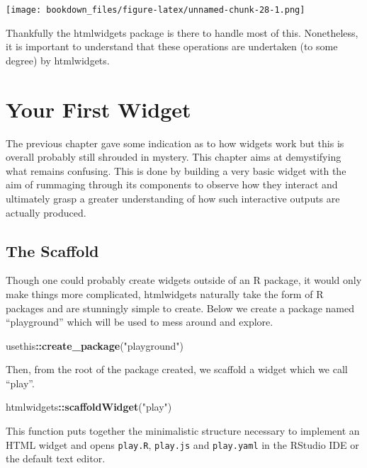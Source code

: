\documentclass[
]{krantz}
\makeatletter
\newenvironment{Shaded}{\begin{snugshade}}{\end{snugshade}}
\newcommand{\KeywordTok}[1]{\textcolor[rgb]{0.27,0.27,0.27}{\textbf{#1}}}
\newcommand{\NormalTok}[1]{#1}
\newcommand{\OperatorTok}[1]{\textcolor[rgb]{0.43,0.43,0.43}{\textbf{#1}}}
\newcommand{\StringTok}[1]{\textcolor[rgb]{0.5,0.5,0.5}{#1}}
\newenvironment{kframe}{%
\medskip{}
\setlength{\fboxsep}{.8em}
 \def\at@end@of@kframe{}%
 \ifinner\ifhmode%
  \def\at@end@of@kframe{\end{minipage}}%
  \begin{minipage}{\columnwidth}%
 \fi\fi%
 \def\FrameCommand##1{\hskip\@totalleftmargin \hskip-\fboxsep
 \colorbox{shadecolor}{##1}\hskip-\fboxsep
     \hskip-\linewidth \hskip-\@totalleftmargin \hskip\columnwidth}%
 \MakeFramed {\advance\hsize-\width
   \@totalleftmargin\z@ \linewidth\hsize
   \@setminipage}}%
 {\par\unskip\endMakeFramed%
 \at@end@of@kframe}
\renewenvironment{Shaded}{\begin{kframe}}{\end{kframe}}
\makeatother
\begin{document}
\texttt{[image: bookdown\_files/figure-latex/unnamed-chunk-28-1.png]}

Thankfully the htmlwidgets package is there to handle most of this. Nonetheless, it is important to understand that these operations are undertaken (to some degree) by htmlwidgets.

\hypertarget{widgets-first}{%
\chapter{Your First Widget}\label{widgets-first}}

The previous chapter gave some indication as to how widgets work but this is overall probably still shrouded in mystery. This chapter aims at demystifying what remains confusing. This is done by building a very basic widget with the aim of rummaging through its components to observe how they interact and ultimately grasp a greater understanding of how such interactive outputs are actually produced.

\hypertarget{widgets-first-scaffold}{%
\section{The Scaffold}\label{widgets-first-scaffold}}

Though one could probably create widgets outside of an R package, it would only make things more complicated, htmlwidgets naturally take the form of R packages and are stunningly simple to create. Below we create a package named ``playground'' which will be used to mess around and explore.

\begin{Shaded}
\begin{Highlighting}[]
\NormalTok{usethis}\OperatorTok{::}\KeywordTok{create\_package}\NormalTok{(}\StringTok{"playground"}\NormalTok{)}
\end{Highlighting}
\end{Shaded}

Then, from the root of the package created, we scaffold a widget which we call ``play''.

\begin{Shaded}
\begin{Highlighting}[]
\NormalTok{htmlwidgets}\OperatorTok{::}\KeywordTok{scaffoldWidget}\NormalTok{(}\StringTok{"play"}\NormalTok{)}
\end{Highlighting}
\end{Shaded}

This function puts together the minimalistic structure necessary to implement an HTML widget and opens \texttt{play.R}, \texttt{play.js} and \texttt{play.yaml} in the RStudio IDE or the default text editor.
\end{document}
